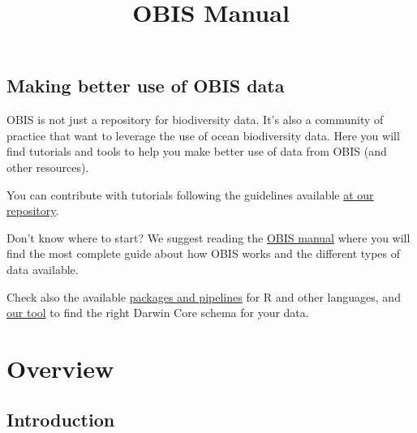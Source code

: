 \documentclass[
  letterpaper,
  DIV=11,
  numbers=noendperiod,
  oneside]{scrreprt}
\title{OBIS Manual}
\author{}
\date{}
\renewcommand*\contentsname{Table of contents}
\newcommand\contentsname{Table of contents}
\begin{document}
\maketitle
\ifdefined\Shaded\renewenvironment{Shaded}{\begin{tcolorbox}[borderline west={3pt}{0pt}{shadecolor}, interior hidden, breakable, enhanced, boxrule=0pt, sharp corners, frame hidden]}{\end{tcolorbox}}\fi

\renewcommand*\contentsname{Table of contents}
{
\hypersetup{linkcolor=}
\setcounter{tocdepth}{2}
\tableofcontents
}

\hypertarget{making-better-use-of-obis-data}{%
\chapter*{Making better use of OBIS
data}\label{making-better-use-of-obis-data}}


OBIS is not just a repository for biodiversity data. It's also a
community of practice that want to leverage the use of ocean
biodiversity data. Here you will find tutorials and tools to help you
make better use of data from OBIS (and other resources).

You can contribute with tutorials following the guidelines available
\href{https://github.com/iobis/resources}{at our repository}.

Don't know where to start? We suggest reading the
\href{https://manual.obis.org/}{OBIS manual} where you will find the
most complete guide about how OBIS works and the different types of data
available.

Check also the available
\href{https://resources.obis.org/packages/}{packages and pipelines} for
R and other languages, and
\href{https://resources.obis.org/find-your-dwc/}{our tool} to find the
right Darwin Core schema for your data.

\part{Overview}

\hypertarget{introduction}{%
\chapter{Introduction}\label{introduction}}
\end{document}
